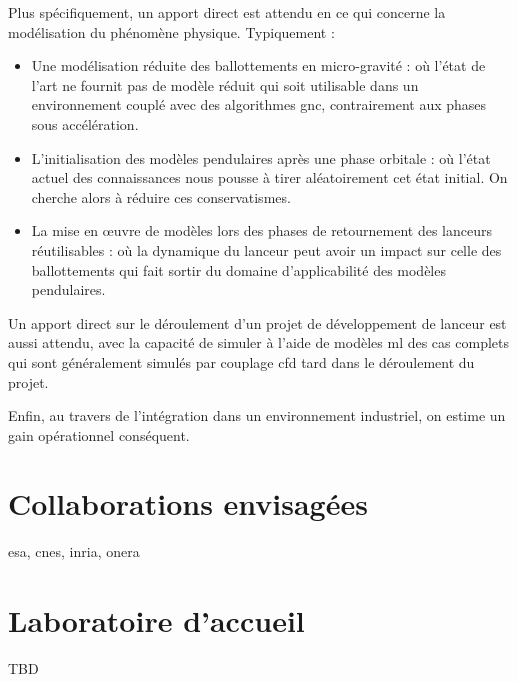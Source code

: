 \documentclass[12pt]{article}
\begin{document}
	Plus spécifiquement, un apport direct est attendu en ce qui concerne la modélisation du phénomène physique. Typiquement :
	\begin{itemize}
		\item Une modélisation réduite des ballottements en micro-gravité : où l'état de l'art ne fournit pas de modèle réduit qui soit utilisable dans un environnement couplé avec des algorithmes \acrshort{gnc}, contrairement aux phases sous accélération.
		\item L'initialisation des modèles pendulaires après une phase orbitale : où l'état actuel des connaissances nous pousse à tirer aléatoirement cet état initial. On cherche alors à réduire ces conservatismes.
		\item La mise en œuvre de modèles lors des phases de retournement des lanceurs réutilisables : où la dynamique du lanceur peut avoir un impact sur celle des ballottements qui fait sortir du domaine d'applicabilité des modèles pendulaires.
	\end{itemize}
	Un apport direct sur le déroulement d'un projet de développement de lanceur est aussi attendu, avec la capacité de simuler à l'aide de modèles \acrshort{ml} des cas complets qui sont généralement simulés par couplage \acrshort{cfd} tard dans le déroulement du projet.
	
	Enfin, au travers de l'intégration dans un environnement industriel, on estime un gain opérationnel conséquent.
	
	\nocite{*}
	
	\printbibliography[title=Bibliographie indicative]
	
	\section*{Collaborations envisagées}
	
	\acrshort{esa}, \acrshort{cnes}, \acrshort{inria}, \acrshort{onera}
	
	\section*{Laboratoire d'accueil}
	
	TBD
	
	\printglossaries
	
\end{document}
